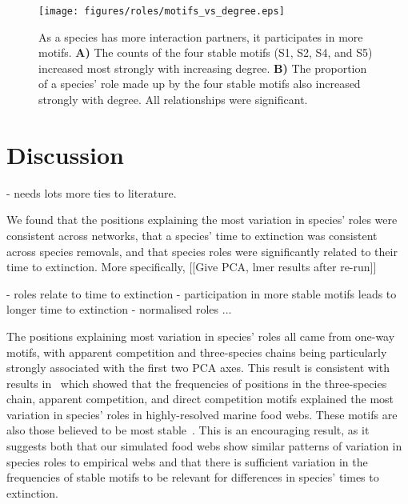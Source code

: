 \documentclass[12pt]{article}
\begin{document}
		\begin{figure}[h!]
			\caption{As a species has more interaction partners, it participates in more motifs. \textbf{A)} The counts of the four stable motifs (S1, S2, S4, and S5) increased most strongly with increasing degree. \textbf{B)} The proportion of a species' role made up by the four stable motifs also increased strongly with degree. All relationships were significant.}
			\label{motif_vs_degree}
			\texttt{[image: figures/roles/motifs\_vs\_degree.eps]}
			\end{figure}



\section{Discussion}

	- needs lots more ties to literature.


	We found that the positions explaining the most variation in species' roles were consistent across networks, that a species' time to extinction was consistent across species removals, and that species roles were significantly related to their time to extinction. More specifically, [[Give PCA, lmer results after re-run]]


	- roles relate to time to extinction
	- participation in more stable motifs leads to longer time to extinction
	- normalised roles ... 


	The positions explaining most variation in species' roles all came from one-way motifs, with apparent competition and three-species chains being particularly strongly associated with the first two PCA axes. This result is consistent with results in~\citet{Cirtwill2018EcolLett} which showed that the frequencies of positions in the three-species chain, apparent competition, and direct competition motifs explained the most variation in species' roles in highly-resolved marine food webs. These motifs are also those believed to be most stable~\citep{Stouffer2007,Borrelli2015a}. This is an encouraging result, as it suggests both that our simulated food webs show similar patterns of variation in species roles to empirical webs and that there is sufficient variation in the frequencies of stable motifs to be relevant for differences in species' times to extinction.
\end{document}
